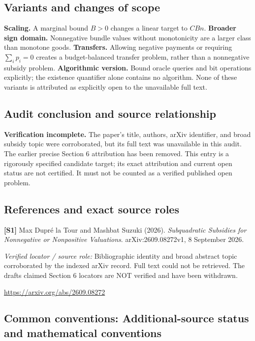 \documentclass[11pt,a4paper]{article}
\begin{document}
\subsection*{Variants and changes of scope}

\textbf{Scaling.} A marginal bound $B>0$ changes a linear target to $CBn$. \textbf{Broader sign domain.} Nonnegative bundle values without monotonicity are a larger class than monotone goods. \textbf{Transfers.} Allowing negative payments or requiring $\sum_i p_i=0$ creates a budget-balanced transfer problem, rather than a nonnegative subsidy problem. \textbf{Algorithmic version.} Bound oracle queries and bit operations explicitly; the existence quantifier alone contains no algorithm. None of these variants is attributed as explicitly open to the unavailable full text.

\subsection*{Audit conclusion and source relationship}

\textbf{Verification incomplete.} The paper's title, authors, arXiv identifier, and broad subsidy topic were corroborated, but its full text was unavailable in this audit. The earlier precise Section 6 attribution has been removed. This entry is a rigorously specified candidate target; its exact attribution and current open status are not certified. It must not be counted as a verified published open problem.

\subsection*{References and exact source roles}

{\footnotesize\raggedright
\par\noindent\textbf{[S1]} Max Dupr\'e la Tour and Mashbat Suzuki (2026). \emph{Subquadratic Subsidies for Nonnegative or Nonpositive Valuations}. arXiv:2609.08272v1, 8 September 2026.\par \textit{Verified locator / source role:} Bibliographic identity and broad abstract topic corroborated by the indexed arXiv record. Full text could not be retrieved. The draft\textquotesingle s claimed Section 6 locators are NOT verified and have been withdrawn.\par \url{https://arxiv.org/abs/2609.08272}\par\smallskip
}

\subsection*{Common conventions: Additional-source status and mathematical conventions}
\end{document}
